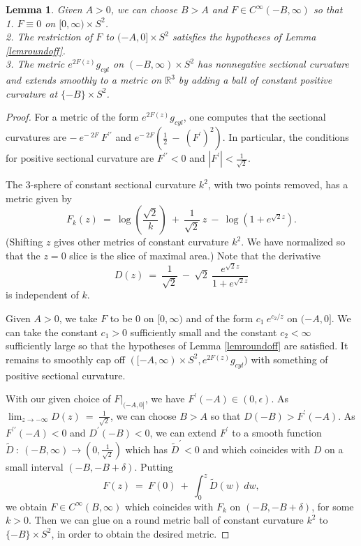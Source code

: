 \documentclass[12pt]{amsart}
\newcommand{\R}{{\mathbb R}}
\numberwithin{equation}{section}
\theoremstyle{plain}
\newtheorem{lemma}[equation]{Lemma}
\theoremstyle{definition}
\theoremstyle{remark}
\begin{document}
\begin{lemma} \label{capoff}
Given $A > 0$, we can choose $B > A$ and
$F  \in  C^\infty(-B,\infty)$ so that \\
1. $F\equiv 0$ on $[0,\infty) \times S^2$. \\
2. The restriction of $F$ to $(-A,0] \times S^2$ 
satisfies the hypotheses of Lemma \ref{lemroundoff}.\\
3. The metric $e^{2F(z)} g_{cyl}$ on $(-B,\infty) \times S^2$ 
has nonnegative sectional curvature and extends
smoothly to a metric on $\R^3$
by adding a ball of constant positive curvature at
$\{-B\} \times S^2$.
\end{lemma}
\begin{proof}
For a metric of the form $e^{2F(z)} g_{cyl}$, one computes that
the sectional curvatures are
$ - \: e^{- \: 2F} \: F^{\prime \prime}$ and $e^{- \: 2F}
\left( \frac12 \: - \: (F^\prime)^2 \right)$.
In particular, the conditions for positive sectional curvature
are $F^{\prime \prime} < 0$ and $|F^\prime| < 
\frac{1}{\sqrt{2}}$.

The $3$-sphere of constant sectional curvature $k^2$,
with two points removed, has a metric given by
\begin{equation}
F_k(z) \: = \:  \log \left( \frac{\sqrt{2}}{k} \right) \: + \: 
\frac{1}{\sqrt{2}} \: z \: - \: \log \left( 1 + e^{\sqrt{2} z} \right).
\end{equation}
(Shifting $z$ gives other metrics of constant curvature $k^2$.
We have normalized so that the $z=0$ slice is the slice of maximal area.)
Note that the derivative
\begin{equation}
D(z) \: = \: \frac{1}{\sqrt{2}} \: - \:
\sqrt{2} \: \frac{e^{\sqrt{2} z}}{1+e^{\sqrt{2} z}}
\end{equation}
is independent of $k$.

Given $A > 0$, we take $F$ to be $0$ on $[0, \infty)$ and of the form
$c_1 \: e^{c_2/z}$ on $(-A, 0]$. We can take the constant
$c_1 > 0$ sufficiently small and the constant $c_2 < \infty$ sufficiently large
so that the hypotheses of Lemma \ref{lemroundoff} are satisfied. It
remains to smoothly cap off 
$([-A, \infty) \times S^2, e^{2F(z)} g_{cyl})$ with something of positive
sectional curvature.

With our given choice of $F \big|_{(-A, 0]}$, we have
$F^\prime(-A) \in (0, \epsilon)$. As 
$\lim_{z \rightarrow -\infty} 
D(z) \: = \: \frac{1}{\sqrt{2}}$, 
we can choose $B > A$
so that $D(-B) > F^\prime(-A)$. As $F^{\prime \prime}(-A) < 0$ and
$D^{\prime}(-B) < 0$, we can extend $F^\prime$ to a smooth function
$\widetilde{D} \: : \: (-B, \infty) \rightarrow \left( 0, 
\frac{1}{\sqrt{2}} \right)$ 
which has $\widetilde{D}^\prime < 0$ and which
coincides with $D$ on a small interval $(-B, -B + \delta)$.
Putting 
\begin{equation}
F(z) \: = \: F(0) \: + \: \int_0^z \widetilde{D}(w) \: dw,
\end{equation}
we obtain 
$F \in C^\infty(B, \infty)$ which coincides with $F_k$ on
$(-B, -B + \delta)$, for some $k > 0$. Then we can glue on a round metric
ball of constant curvature $k^2$ to $\{-B\} \times S^2$, in order to
obtain the desired metric.
\end{proof}
\end{document}
